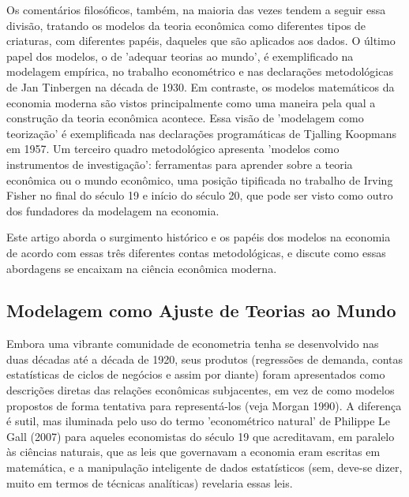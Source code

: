 \documentclass[12pt]{article}
\begin{document}
Os comentários filosóficos, também, na maioria das vezes tendem a seguir essa divisão, tratando os modelos da teoria econômica como diferentes tipos de criaturas, com diferentes papéis, daqueles que são aplicados aos dados. O último papel dos modelos, o de 'adequar teorias ao mundo', é exemplificado na modelagem empírica, no trabalho econométrico e nas declarações metodológicas de Jan Tinbergen na década de 1930. Em contraste, os modelos matemáticos da economia moderna são vistos principalmente como uma maneira pela qual a construção da teoria econômica acontece. Essa visão de 'modelagem como teorização' é exemplificada nas declarações programáticas de Tjalling Koopmans em 1957. Um terceiro quadro metodológico apresenta 'modelos como instrumentos de investigação': ferramentas para aprender sobre a teoria econômica ou o mundo econômico, uma posição tipificada no trabalho de Irving Fisher no final do século 19 e início do século 20, que pode ser visto como outro dos fundadores da modelagem na economia.

Este artigo aborda o surgimento histórico e os papéis dos modelos na economia de acordo com essas três diferentes contas metodológicas, e discute como essas abordagens se encaixam na ciência econômica moderna.

\subsection{\textbf{Modelagem como Ajuste de Teorias ao Mundo}}
Embora uma vibrante comunidade de econometria tenha se desenvolvido nas duas décadas até a década de 1920, seus produtos (regressões de demanda, contas estatísticas de ciclos de negócios e assim por diante) foram apresentados como descrições diretas das relações econômicas subjacentes, em vez de como modelos propostos de forma tentativa para representá-los (veja Morgan 1990). A diferença é sutil, mas iluminada pelo uso do termo 'econométrico natural' de Philippe Le Gall (2007) para aqueles economistas do século 19 que acreditavam, em paralelo às ciências naturais, que as leis que governavam a economia eram escritas em matemática, e a manipulação inteligente de dados estatísticos (sem, deve-se dizer, muito em termos de técnicas analíticas) revelaria essas leis.
\end{document}
